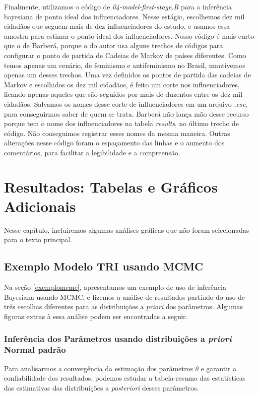 \documentclass[
	12pt,				%
	openright,			%
	twoside,			%
	a4paper,			%
	english,			%
	brazil				%
	]{abntex2}
\begin{document}
\begin{anexosenv}
 Finalmente, utilizamos o código de \textit{04-model-first-stage.R} para a inferência bayesiana de ponto ideal dos influenciadores. Nesse estágio, escolhemos dez mil cidadãos que seguem mais de dez influenciadores do estudo, e usamos essa amostra para estimar o ponto ideal dos influenciadores. Nosso código é mais curto que o de Barberá, porque o do autor usa alguns trechos de códigos para configurar o ponto de partida de Cadeias de Markov de países diferentes. Como temos apenas um cenário, de feminismo e antifeminismo no Brasil, mantivemos apenas um desses trechos. Uma vez definidos os pontos de partida das cadeias de Markov e escolhidos os dez mil cidadãos, é feito um corte nos influenciadores, ficando apenas aqueles que são seguidos por mais de duzentos entre os dez mil cidadãos. Salvamos os nomes desse corte de influenciadores em um arquivo \textit{.csv}, para conseguirmos saber de quem se trata. Barberá não lança mão desse recurso porque tem o nome dos influenciadores na tabela \textit{results}, no último trecho de código. Não conseguimos registrar esses nomes da mesma maneira. Outras alterações nesse código foram o espaçamento das linhas e o aumento dos comentários, para facilitar a legibilidade e a compreensão.
 
 \chapter{Resultados: Tabelas e Gráficos Adicionais}\label{figurascompletas}
 Nesse capítulo, incluiremos algumas análises gráficas que não foram selecionadas para o texto principal.
 
 \section{Exemplo Modelo TRI usando MCMC}\label{trimcmcextra}
 Na seção \ref{exemplomcmc}, apresentamos um exemplo de uso de inferência Bayesiana usando MCMC, e fizemos a análise de resultados partindo do uso de três escolhas diferentes para as distribuições a \textit{priori} dos parâmetros. Algumas figuras extras à essa análise podem ser encontradas a seguir.
 
 \subsection{Inferência dos Parâmetros usando distribuições a \emph{priori} Normal padrão}\label{extrapadrao}
 Para analisarmos a convergência da estimação dos parâmetros $\theta$ e garantir a confiabilidade dos resultados, podemos estudar a tabela-resumo das estatísticas das estimativas das distribuições a \textit{posteriori} desses parâmetros.
 

\end{anexosenv}
\end{document}
